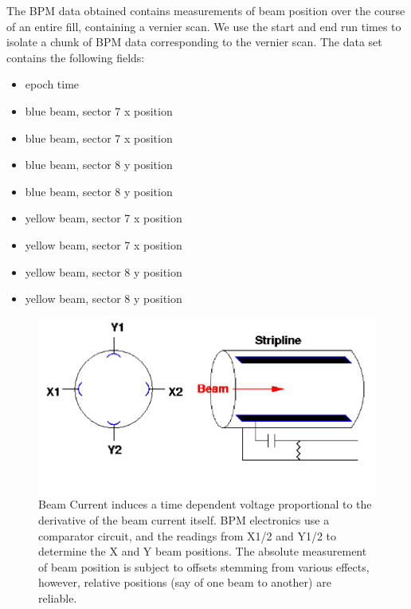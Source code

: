 The BPM data obtained contains measurements of beam position over the course of
an entire fill, containing a vernier scan. We use the start and end run times to
isolate a chunk of BPM data corresponding to the vernier scan. The data set
contains the following fields:
\begin{itemize}
\item epoch time
\item blue beam, sector 7 x position
\item blue beam, sector 7 x position
\item blue beam, sector 8 y position
\item blue beam, sector 8 y position
\item yellow beam, sector 7 x position
\item yellow beam, sector 7 x position
\item yellow beam, sector 8 y position
\item yellow beam, sector 8 y position
\end{itemize}

\begin{figure}[ht]
  \begin{center}
    \includegraphics[width=1.0\linewidth]{./figures/bpm_schematic}
    \caption{ Beam Current induces a time dependent voltage proportional to the derivative of
      the beam current itself. BPM electronics use a comparator circuit, and the readings from
      X1/2 and Y1/2 to determine the X and Y beam positions. The absolute measurement of beam
      position is subject to offsets stemming from various effects, however, relative positions
    (say of one beam to another) are reliable.~\cite{kawallfocus2005}}
    \label{fig:bpm_schematic_cartoon}
  \end{center}
\end{figure}


